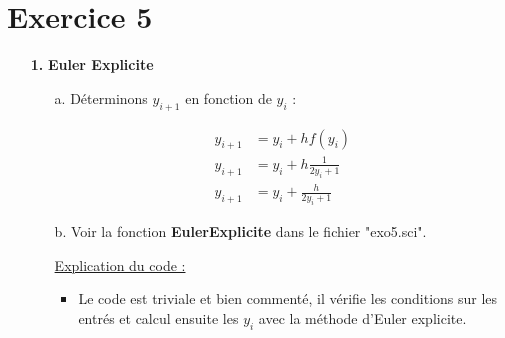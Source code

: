 \documentclass[12pt, letterpaper]{article}
\begin{document}
\section*{Exercice 5}

\begin{enumerate}

\item[\textbf{1.}]\textbf{Euler Explicite}

\begin{enumerate}

\item[a.] Déterminons $y_{i+1}$ en fonction de $y_i$ :

  \begin{equation*}
    \begin{split}
      y_{i+1} & = y_i + h f(y_i) \\
      y_{i+1} & = y_i + h \frac{1}{2y_i + 1} \\
      y_{i+1} & = y_i + \frac{h}{2y_i + 1}
    \end{split}
  \end{equation*}

\item[b.] Voir la fonction \textbf{EulerExplicite} dans le fichier
  "exo5.sci".\newline

  \underline{Explication du code :} \newline
  \begin{itemize}
    \item Le code est triviale et bien commenté, il vérifie les
      conditions sur les entrés et calcul ensuite les $y_i$ avec la
      méthode d'Euler explicite.
  \end{itemize}


\end{enumerate}
\end{enumerate}
\end{document}
